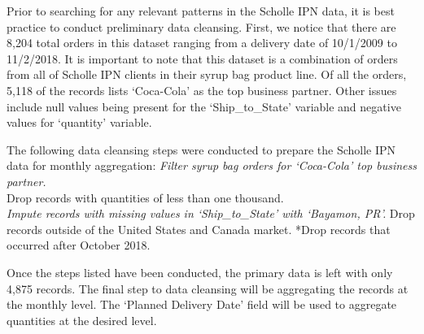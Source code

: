 \documentclass[12pt,oneside]{chicagocapstone}
\begin{document}
Prior to searching for any relevant patterns in the Scholle IPN data, it
is best practice to conduct preliminary data cleansing. First, we notice
that there are 8,204 total orders in this dataset ranging from a
delivery date of 10/1/2009 to 11/2/2018. It is important to note that
this dataset is a combination of orders from all of Scholle IPN clients
in their syrup bag product line. Of all the orders, 5,118 of the records
lists `Coca-Cola' as the top business partner. Other issues include null
values being present for the `Ship\_to\_State' variable and negative
values for `quantity' variable.

The following data cleansing steps were conducted to prepare the Scholle
IPN data for monthly aggregation: \emph{Filter syrup bag orders for
`Coca-Cola' top business partner.\\
}Drop records with quantities of less than one thousand.\\
\emph{Impute records with missing values in `Ship\_to\_State' with
`Bayamon, PR'. }Drop records outside of the United States and Canada
market. *Drop records that occurred after October 2018.

Once the steps listed have been conducted, the primary data is left with
only 4,875 records. The final step to data cleansing will be aggregating
the records at the monthly level. The `Planned Delivery Date' field will
be used to aggregate quantities at the desired level.
\end{document}
